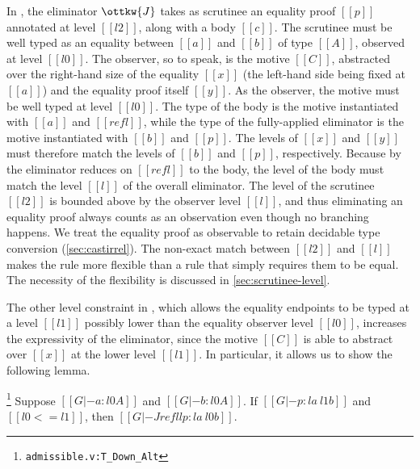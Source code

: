 \documentclass[acmsmall, screen=true, nonacm=true,
  review=\ifpublic false\else true\fi,
  anonymous=\ifanonymous true\else false\fi
]{acmart}
\newcommand{\sw}[1]{}
\newcommand{\suppl}[3]{{\scriptsize\texttt{#2:#3}}}
\newlength{\punctwidth}
\newcommand{\stack}[1]{%
  \settowidth{\punctwidth}{#1}%
  \hspace*{-\the\punctwidth}%
}
\begin{document}
In , the eliminator $\ottkw{J}$ takes as scrutinee
an equality proof $[[p]]$ annotated at level $[[l2]]$,
along with a body $[[c]]$.
The scrutinee must be well typed as an equality between $[[a]]$ and $[[b]]$
of type $[[A]]$, observed at level $[[l0]]$.
The observer, so to speak, is the motive $[[C]]$,
abstracted over the right-hand size of the equality $[[x]]$
(the left-hand side being fixed at $[[a]]$)
and the equality proof itself $[[y]]$.
As the observer, the motive must be well typed at level $[[l0]]$.
The type of the body is the motive instantiated with $[[a]]$ and $[[refl]]$,
while the type of the fully-applied eliminator is the motive instantiated with $[[b]]$ and $[[p]]$.
The levels of $[[x]]$ and $[[y]]$ must therefore match the levels of $[[b]]$ and $[[p]]$, respectively.
Because by  the eliminator reduces on $[[refl]]$ to the body,
the level of the body must match the level $[[l]]$ of the overall
eliminator.
The level of the scrutinee $[[l2]]$ is bounded above by the observer
level $[[l]]$, and thus
eliminating an equality proof always counts as an observation even
though no branching happens. We treat the equality proof as observable
to retain decidable type conversion (\cref{sec:castirrel}).
The non-exact match between $[[l2]]$ and $[[l]]$ makes the
rule more flexible than a rule that simply requires them to be
equal. The necessity of the flexibility is discussed in
\cref{sec:scrutinee-level}.



The other level constraint in ,
which allows the equality endpoints to be typed at a level $[[l1]]$
possibly lower than the equality observer level $[[l0]]$,
increases the expressivity of the eliminator,
since the motive $[[C]]$ is able to abstract over $[[x]]$ at the lower level $[[l1]]$.
In particular, it allows us to show the following lemma.

\begin{lemma}[Downgrade]
  \stack{.~}\footnote{\suppl{theories}{admissible.v}{T\_Down\_Alt}}
  \label{lem:downgrade}
  Suppose $[[G |- a : l0 A]]$ and $[[G |- b : l0 A]]$.
  If $[[G |- p : l a ~ l1 b]]$ and $[[l0 <= l1]]$,
  then $[[G |- J refl l p : l a ~ l0 b]]$.
\end{lemma}
\end{document}
